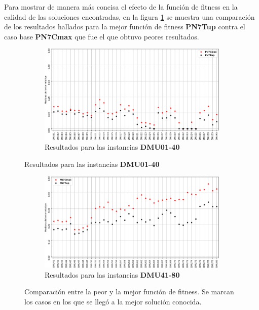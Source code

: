 Para mostrar de manera más concisa el efecto de la función de fitness en la calidad de las soluciones encontradas, en la figura \ref{fig:PN7CmaxvsPN7Tup} se muestra una comparación de los resultados hallados para la mejor función de fitness \textbf{PN7Tup} contra el caso base \textbf{PN7Cmax} que fue el que obtuvo peores resultados.
\begin{figure}[hbtp]
    \begin{subfigure}{\textwidth}
        \centering
        \includegraphics[scale=.65]{Imagenes/PN7CmaxvsPN7Tup_1.png}
        \caption{Resultados para las instancias \textbf{DMU01-40}}
    \end{subfigure}
\end{figure}
\begin{figure}[H]\ContinuedFloat
    \begin{subfigure}{\textwidth}
        \centering
        \includegraphics[scale=.65]{Imagenes/PN7CmaxvsPN7Tup_2.png}
        \caption{Resultados para las instancias \textbf{DMU41-80}}
    \end{subfigure}
    \caption{Comparación entre la peor y la mejor función de fitness. Se marcan los casos en los que se llegó a la mejor solución conocida.}
    \label{fig:PN7CmaxvsPN7Tup}
\end{figure}



